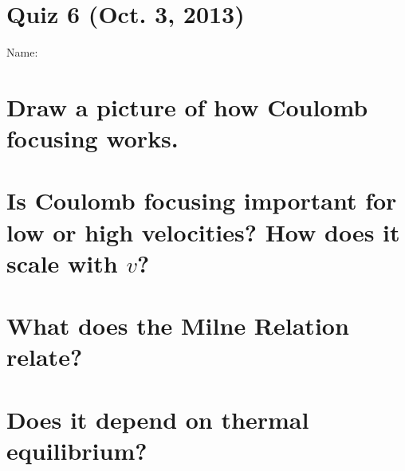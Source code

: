 \documentclass[11pt]{article}
\begin{document}
\pagestyle{empty}
\parindent=0pt

\section*{\centering Quiz 6 (Oct.  3, 2013)}

{\large
Name:\\
}

\section{Draw a picture of how Coulomb focusing works.}
\vspace{1.5in}
\section{Is Coulomb focusing important for low or high velocities?  How does it scale with $v$?}
\vspace{1.5in}

\section{What does the Milne Relation relate?}
\vspace{1.5in}

\section{Does it depend on thermal equilibrium?}
~
\vspace{1.5in}
\end{document}
